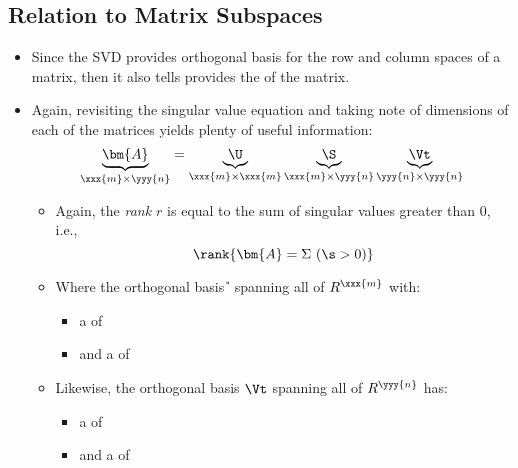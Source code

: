 \begin{itemize}
  \subsection{Relation to Matrix Subspaces}\label{SVD Relation to Subspaces}
  \begin{itemize}
    \item Since the SVD provides orthogonal basis for the row and column spaces of a matrix, then it also tells provides the \hyperref[Null Space]{} of the matrix.
    \item Again, revisiting the singular value equation and taking note of dimensions of each of the matrices yields plenty of useful information:
    \[%
    \underbrace{\bm{A}}_{\xxx{m} \times \yyy{n}} = \underbrace{\U}_{\xxx{m} \times \xxx{m}} \underbrace{\S}_{\xxx{m} \times \yyy{n}} \underbrace{\Vt}_{\yyy{n} \times \yyy{n}}
    \]%
    \begin{itemize}
      \item Again, the \emph{rank \(r\)} is equal to the sum of singular values greater than 0, i.e.,
      \[%
      \rank{\bm{A}=\Sigma~(\s > 0)}
      \]%
      \item Where the orthogonal basis \U~spanning all of \(R^{\xxx{m}}\) with:
        \begin{itemize}
          \item a  of 
          \item and a  of 
        \end{itemize}
      \item Likewise, the orthogonal basis \(\Vt\) spanning all of \(R^\yyy{n}\) has:
      \begin{itemize}
        \item a  of 
        \item and a  of 
      \end{itemize}
    \end{itemize}
  \end{itemize}
\end{itemize}

\newpage 

